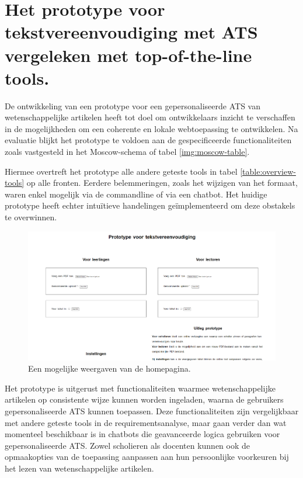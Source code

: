 \section{Het prototype voor tekstvereenvoudiging met ATS vergeleken met top-of-the-line tools.}


De ontwikkeling van een prototype voor een gepersonaliseerde ATS van wetenschappelijke artikelen heeft tot doel om ontwikkelaars inzicht te verschaffen in de mogelijkheden om een coherente en lokale webtoepassing te ontwikkelen. Na evaluatie blijkt het prototype te voldoen aan de gespecificeerde functionaliteiten zoals vastgesteld in het Moscow-schema of tabel \ref{img:moscow-table}. 

Hiermee overtreft het prototype alle andere geteste tools in tabel \ref{table:overview-tools} op alle fronten. Eerdere belemmeringen, zoals het wijzigen van het formaat, waren enkel mogelijk via de commandline of via een chatbot. Het huidige prototype heeft echter intuïtieve handelingen geïmplementeerd om deze obstakels te overwinnen. 

\begin{center}
	\begin{figure}[H]
		\includegraphics[width=\linewidth]{img/proto-homescreen.png}
		\caption{Een mogelijke weergaven van de homepagina.}		
		\label{img:homepage}
	\end{figure}
\end{center}

Het prototype is uitgerust met functionaliteiten waarmee wetenschappelijke artikelen op consistente wijze kunnen worden ingeladen, waarna de gebruikers gepersonaliseerde ATS kunnen toepassen. Deze functionaliteiten zijn vergelijkbaar met andere geteste tools in de requirementsanalyse, maar gaan verder dan wat momenteel beschikbaar is in chatbots die geavanceerde logica gebruiken voor gepersonaliseerde ATS. Zowel scholieren als docenten kunnen ook de opmaakopties van de toepassing aanpassen aan hun persoonlijke voorkeuren bij het lezen van wetenschappelijke artikelen. 

